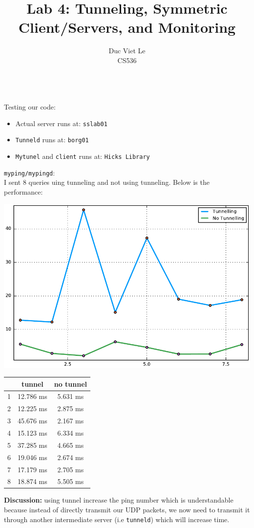 \documentclass[12pt]{article}
\newenvironment{problem}[2][Problem]{\begin{trivlist}
\item[\hskip \labelsep {\bfseries #1}\hskip \labelsep {\bfseries #2.}]}{\end{trivlist}}
\begin{document}
 
\title{Lab 4: Tunneling, Symmetric Client/Servers, and Monitoring}
\author{Duc Viet Le\\
 CS536}
 
\maketitle
 
\begin{problem}{1} \ \\
Testing our code:
	\begin{itemize}
		\item Actual server runs at: \texttt{sslab01} 
		\item \texttt{Tunneld} runs at: \texttt{borg01} 
		\item \texttt{Mytunel} and \texttt{client} runs at: \texttt{Hicks Library}
	\end{itemize}
\texttt{myping/mypingd}: \\
I sent 8 queries uing tunneling and not using tunneling. Below is the performance:
	\begin{center}
		\includegraphics[scale=.5]{1.pdf}	
		\begin{tabular}{c|c|c}
		    & tunnel &  no tunnel \\ \hline
		1   & 12.786 ms&  5.631 ms\\
		2   & 12.225 ms&  2.875 ms\\
		3   & 45.676 ms&  2.167 ms\\
		4   & 15.123 ms&  6.334 ms\\
		5   & 37.285 ms&  4.665 ms\\
		6   & 19.046 ms&  2.674 ms\\
		7   & 17.179 ms&  2.705 ms\\
		8   & 18.874 ms&  5.505 ms\\
		\end{tabular}  
	\end{center}
	\textbf{Discussion:} using tunnel increase the ping number which is understandable because instead of directly transmit our UDP packets, we now need to transmit it through another intermediate server (i.e \texttt{tunneld}) which will increase time. \\


\end{problem}
\end{document}
